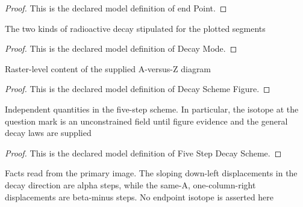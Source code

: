 \begin{proof}
  This is the declared model definition of end Point.
\end{proof}
\begin{definition}
  \label{def:physics:phyx-mini-0574:phyxminiproblems-problemphyxmini0574-decaymode}
  The two kinds of radioactive decay stipulated for the plotted segments
\end{definition}
\begin{proof}
  This is the declared model definition of Decay Mode.
\end{proof}
\begin{definition}
  \label{def:physics:phyx-mini-0574:phyxminiproblems-problemphyxmini0574-decayschemefigure}
  Raster-level content of the supplied A-versus-Z diagram
\end{definition}
\begin{proof}
  This is the declared model definition of Decay Scheme Figure.
\end{proof}
\begin{definition}
  \label{def:physics:phyx-mini-0574:phyxminiproblems-problemphyxmini0574-fivestepdecayscheme}
  Independent quantities in the five-step scheme. In particular, the isotope at the question mark is an unconstrained field until figure evidence and the general decay laws are supplied
\end{definition}
\begin{proof}
  This is the declared model definition of Five Step Decay Scheme.
\end{proof}
\begin{definition}
  \label{def:physics:phyx-mini-0574:phyxminiproblems-problemphyxmini0574-matchessupplieddecayfigure}
  Facts read from the primary image. The sloping down-left displacements in the decay direction are alpha steps, while the same-A, one-column-right displacements are beta-minus steps. No endpoint isotope is asserted here
\end{definition}
